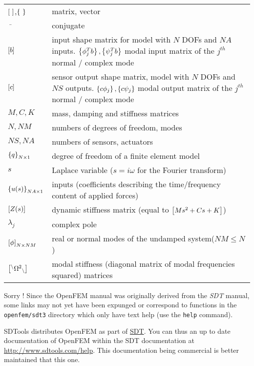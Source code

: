 \lvs\noindent\begin{tabular}{@{}p{}@{}p{}@{}}
%
$\ma{\ }$,$\left\{\ \right\}$  & matrix, vector \\
$\bar{\ \ \ }$ & conjugate \\
$\left[b\right]$          & input shape matrix for model with $N$ DOFs and 
                   $NA$ inputs. $\left\{\phi_j^Tb\right\},\left\{\psi_j^Tb\right\}$  modal input matrix of the $j^{th}$ normal / complex mode\\
$\left[c\right]$          & sensor output shape matrix, model with $N$ DOFs and $NS$ 
                   outputs. $\left\{c\phi_j\right\},\left\{c\psi_j\right\}$ modal output matrix of the $j^{th}$ normal / complex  mode\\
$M,C,K$        &  mass, damping and stiffness matrices\\
$N,NM$   & numbers of degrees of freedom, modes \\ 
$NS,NA$ & numbers of sensors, actuators \\
$\left\{q\right\}_{N \times 1}$ &  degree of freedom of a finite element model\\
$s$               & Laplace variable ($s=i\omega$ for the Fourier transform)\\
$\left\{u(s)\right\}_{NA \times 1}$               & inputs (coefficients describing the time/frequency content of 
                    applied forces) \\
$\left[Z(s)\right]$   & dynamic stiffness matrix (equal to $\left[Ms^2+Cs+K\right]$)\\
$\lambda_j$               & complex pole\\
$\left[\phi\right]_{N \times NM}$               &  real or normal modes of the undamped system($NM \leq N$) \\
$\left[^{\backslash} \mbox{$\Omega^2$} _{\backslash} \right]$ & modal stiffness (diagonal  matrix of modal frequencies squared) matrices\\
%
\end{tabular}


Sorry ! Since the OpenFEM manual was originally  derived from the {\sl SDT} manual, some links may not yet have been expunged or correspond to functions in the  {\tt openfem/sdt3} directory which only have text help (use the {\tt help} command).

SDTools distributes OpenFEM as part of \href{http://www.sdtools.com/sdt}{SDT}. You can thus an up to date documentation of OpenFEM within the SDT documentation at \url{http://www.sdtools.com/help}. This documentation being commercial is better maintained that this one.

